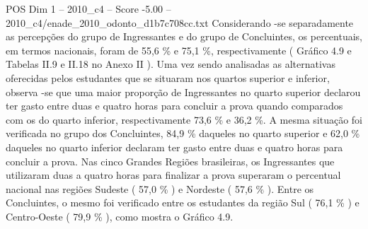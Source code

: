 \begin{textsample}{POS Dim 1 – 2010\_c4 – Score -5.00 – 2010\_c4/enade\_2010\_odonto\_d1b7c708cc.txt}
Considerando -se separadamente as percepções do grupo de Ingressantes e do grupo de Concluintes, os percentuais, em termos nacionais, foram de 55,6 \% e 75,1 \%, respectivamente ( Gráfico 4.9 e Tabelas II.9 e II.18 no Anexo II ).
Uma vez sendo analisadas as alternativas oferecidas pelos estudantes que se situaram nos quartos superior e inferior, observa -se que uma maior proporção de Ingressantes no quarto superior declarou ter gasto entre duas e quatro horas para concluir a prova quando comparados com os do quarto inferior, respectivamente 73,6 \% e 36,2 \%.
A mesma situação foi verificada no grupo dos Concluintes, 84,9 \% daqueles no quarto superior e 62,0 \% daqueles no quarto inferior declaram ter gasto entre duas e quatro horas para concluir a prova.
Nas cinco Grandes Regiões brasileiras, os Ingressantes que utilizaram duas a quatro horas para finalizar a prova superaram o percentual nacional nas regiões Sudeste ( 57,0 \% ) e Nordeste ( 57,6 \% ).
Entre os Concluintes, o mesmo foi verificado entre os estudantes da região Sul ( 76,1 \% ) e Centro-Oeste ( 79,9 \% ), como mostra o Gráfico 4.9.

\end{textsample}
